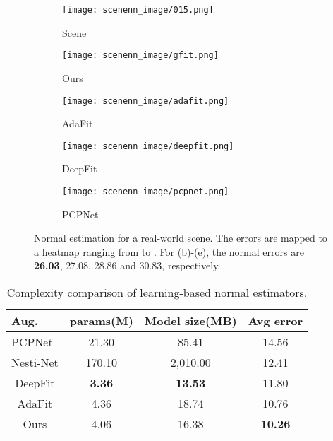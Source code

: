 \documentclass[runningheads]{llncs}
\begin{document}
\begin{figure}[]
  \centering

  \begin{subfigure}{0.19\linewidth}
    \texttt{[image: scenenn\_image/015.png]}
    \caption{Scene}
  \end{subfigure}
       \begin{subfigure}{0.19\linewidth}
    \texttt{[image: scenenn\_image/gfit.png]}
    \caption{Ours}
  \end{subfigure}
  \begin{subfigure}{0.19\linewidth}
    \texttt{[image: scenenn\_image/adafit.png]}
    \caption{AdaFit}
  \end{subfigure}
  \begin{subfigure}{0.19\linewidth}
    \texttt{[image: scenenn\_image/deepfit.png]}
    \caption{DeepFit}
  \end{subfigure}
  \begin{subfigure}{0.19\linewidth}
    \texttt{[image: scenenn\_image/pcpnet.png]}
    \caption{PCPNet}
  \end{subfigure}
  \caption{Normal estimation for a real-world scene.
  The errors are mapped to a heatmap ranging from  to . For (b)-(e), the normal errors are \textbf{26.03}, 27.08, 28.86 and 30.83, respectively.
}
  \label{fig:quali2}
\end{figure}
\begin{table}[t]
\begin{center}
\caption{Complexity comparison of learning-based normal estimators.}
\begin{tabular}{@{}cccc@{}}
\toprule
\multicolumn{1}{l}{\textbf{Aug.}}   & params(M) & Model size(MB) & Avg error             \\ \midrule
\multicolumn{1}{l}{PCPNet} & 21.30           & 85.41    & 14.56                     \\
Nesti-Net              & 170.10          & 2,010.00     & 12.41                     \\
DeepFit                  & \textbf{3.36}          & \textbf{13.53}    & 11.80                      \\
AdaFit                  & 4.36           & 18.74    & 10.76                     \\
Ours                       & 4.06           & 16.38    & \textbf{10.26} \\ \bottomrule
\end{tabular}

\label{tab:eff}
\end{center}
\end{table}
\end{document}
